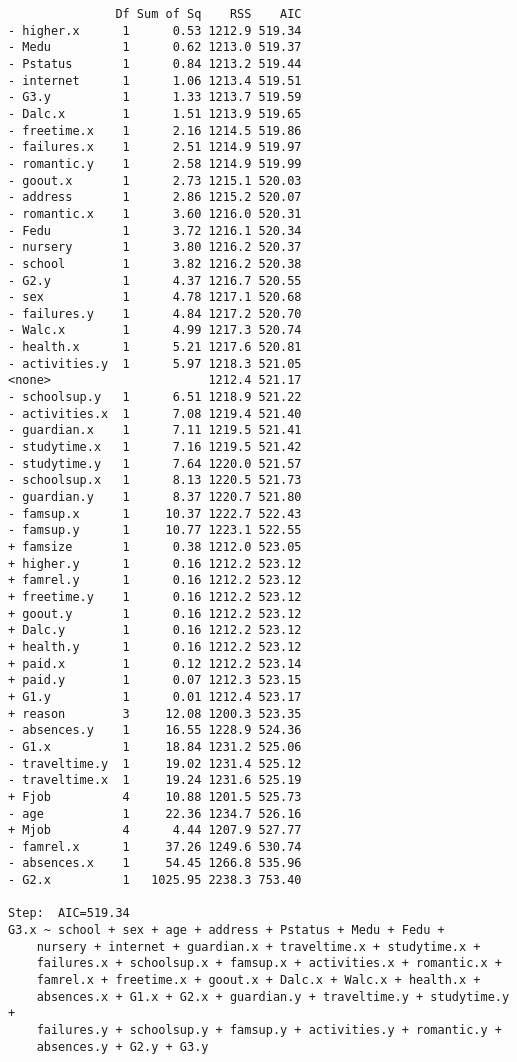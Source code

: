 \documentclass[11pt]{article}
\begin{document}
\begin{enumerate}
\begin{verbatim}
               Df Sum of Sq    RSS    AIC
- higher.x      1      0.53 1212.9 519.34
- Medu          1      0.62 1213.0 519.37
- Pstatus       1      0.84 1213.2 519.44
- internet      1      1.06 1213.4 519.51
- G3.y          1      1.33 1213.7 519.59
- Dalc.x        1      1.51 1213.9 519.65
- freetime.x    1      2.16 1214.5 519.86
- failures.x    1      2.51 1214.9 519.97
- romantic.y    1      2.58 1214.9 519.99
- goout.x       1      2.73 1215.1 520.03
- address       1      2.86 1215.2 520.07
- romantic.x    1      3.60 1216.0 520.31
- Fedu          1      3.72 1216.1 520.34
- nursery       1      3.80 1216.2 520.37
- school        1      3.82 1216.2 520.38
- G2.y          1      4.37 1216.7 520.55
- sex           1      4.78 1217.1 520.68
- failures.y    1      4.84 1217.2 520.70
- Walc.x        1      4.99 1217.3 520.74
- health.x      1      5.21 1217.6 520.81
- activities.y  1      5.97 1218.3 521.05
<none>                      1212.4 521.17
- schoolsup.y   1      6.51 1218.9 521.22
- activities.x  1      7.08 1219.4 521.40
- guardian.x    1      7.11 1219.5 521.41
- studytime.x   1      7.16 1219.5 521.42
- studytime.y   1      7.64 1220.0 521.57
- schoolsup.x   1      8.13 1220.5 521.73
- guardian.y    1      8.37 1220.7 521.80
- famsup.x      1     10.37 1222.7 522.43
- famsup.y      1     10.77 1223.1 522.55
+ famsize       1      0.38 1212.0 523.05
+ higher.y      1      0.16 1212.2 523.12
+ famrel.y      1      0.16 1212.2 523.12
+ freetime.y    1      0.16 1212.2 523.12
+ goout.y       1      0.16 1212.2 523.12
+ Dalc.y        1      0.16 1212.2 523.12
+ health.y      1      0.16 1212.2 523.12
+ paid.x        1      0.12 1212.2 523.14
+ paid.y        1      0.07 1212.3 523.15
+ G1.y          1      0.01 1212.4 523.17
+ reason        3     12.08 1200.3 523.35
- absences.y    1     16.55 1228.9 524.36
- G1.x          1     18.84 1231.2 525.06
- traveltime.y  1     19.02 1231.4 525.12
- traveltime.x  1     19.24 1231.6 525.19
+ Fjob          4     10.88 1201.5 525.73
- age           1     22.36 1234.7 526.16
+ Mjob          4      4.44 1207.9 527.77
- famrel.x      1     37.26 1249.6 530.74
- absences.x    1     54.45 1266.8 535.96
- G2.x          1   1025.95 2238.3 753.40

Step:  AIC=519.34
G3.x ~ school + sex + age + address + Pstatus + Medu + Fedu + 
    nursery + internet + guardian.x + traveltime.x + studytime.x + 
    failures.x + schoolsup.x + famsup.x + activities.x + romantic.x + 
    famrel.x + freetime.x + goout.x + Dalc.x + Walc.x + health.x + 
    absences.x + G1.x + G2.x + guardian.y + traveltime.y + studytime.y + 
    failures.y + schoolsup.y + famsup.y + activities.y + romantic.y + 
    absences.y + G2.y + G3.y


\end{verbatim}
\end{enumerate}
\end{document}
